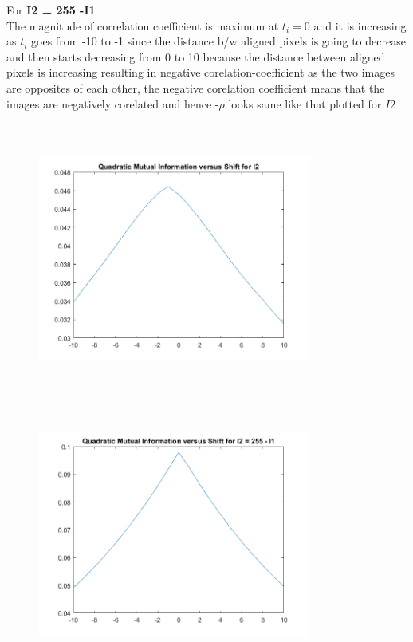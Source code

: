 \documentclass{article}
\begin{document}
    For \textbf{I2 = 255 -I1}\\
    The magnitude of correlation coefficient is maximum at $t_i = 0$ and it is increasing as $t_i$ goes from -10 to -1 since the distance b/w aligned pixels is going to decrease and then starts decreasing from 0 to 10 because the distance between aligned pixels is increasing resulting in negative  corelation-coefficient as  the two images are opposites of each other, the negative corelation coefficient means that the images are negatively corelated and hence -$\rho$ looks same like that plotted for $I2$\par 
    \begin{figure}[H]
    \begin{floatrow}
    {\includegraphics[width =9cm, height=9cm]{f1.png}}
    {\includegraphics[width =9cm, height=9cm]{f2.png}}
    \end{floatrow}
    \end{figure}\par
\end{document}
